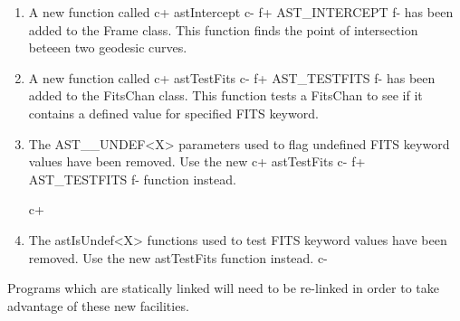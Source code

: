 \documentclass[twoside,11pt]{article}
\begin{document}
\begin{enumerate}


\item A new function called 
c+
astIntercept
c-
f+
AST\_INTERCEPT
f-
has been added to the Frame class. This function finds the point of
intersection beteeen two geodesic curves.


\item A new function called
c+
astTestFits
c-
f+
AST\_TESTFITS
f-
has been added to the FitsChan class. This function tests a FitsChan to
see if it contains a defined value for specified FITS keyword.

\item The AST\_\_UNDEF<X> parameters used to flag undefined FITS keyword values
have been removed. Use the new 
c+
astTestFits
c-
f+
AST\_TESTFITS
f-
function instead.

c+
\item The astIsUndef<X> functions used to test FITS keyword values
have been removed. Use the new astTestFits function instead.
c-

\end{enumerate}

Programs which are statically linked will need to be re-linked in
order to take advantage of these new facilities.
\end{document}

